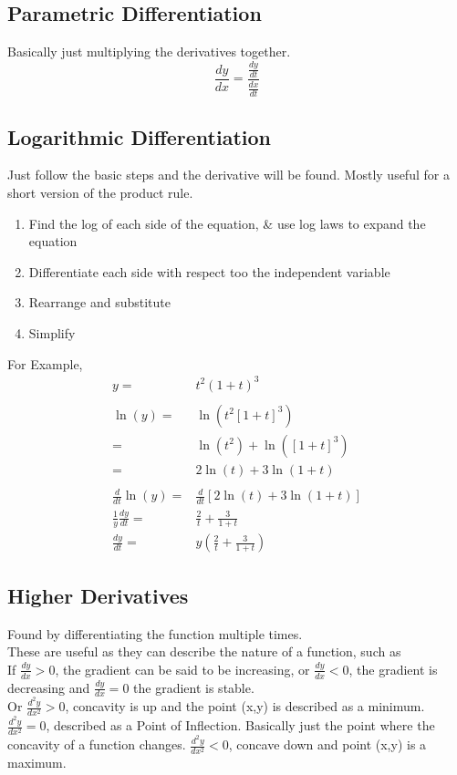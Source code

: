 \documentclass[a5paper]{article}
\begin{document}
	\subsection{Parametric Differentiation}
	Basically just multiplying the derivatives together.
	$$\frac{dy}{dx}=\frac{\frac{dy}{dt}}{\frac{dx}{dt}}$$

	\pagebreak

	\subsection{Logarithmic Differentiation}
	Just follow the basic steps and the derivative will be found. Mostly useful for a short version of the product rule.
	\begin{enumerate}
		\item Find the log of each side of the equation, \& use log laws to expand the equation
		\item Differentiate each side with respect too the independent variable
		\item Rearrange and substitute
		\item Simplify
	\end{enumerate}
	For Example,
	\begin{align*}
		y=&t^{2}(1+t)^{3}\\\\
		\ln{(y)}=&\ln{(t^{2}[1+t]^{3})}\\
			=&\ln{(t^{2})}+\ln{([1+t]^{3})}\\
			=&2\ln{(t)}+3\ln{(1+t)}\\\\
		\frac{d}{dt}\ln{(y)}=&\frac{d}{dt}[2\ln{(t)}+3\ln{(1+t)}]\\
		\frac{1}{y}\frac{dy}{dt}=&\frac{2}{t}+\frac{3}{1+t}\\
		\frac{dy}{dt}=&y(\frac{2}{t}+\frac{3}{1+t})
	\end{align*}
	
	\subsection{Higher Derivatives}
	Found by differentiating the function multiple times.\\
	These are useful as they can describe the nature of a function, such as\\
	If $\frac{dy}{dx}>0$, the gradient can be said to be increasing, or $\frac{dy}{dx}<0$, the gradient is decreasing and $\frac{dy}{dx}=0$ the gradient is stable.\\
	Or $\frac{d^{2}y}{dx^{2}}>0$, concavity is up and the point (x,y) is described as a minimum. $\frac{d^{2}y}{dx^{2}}=0$, described as a Point of Inflection. Basically just the point where the concavity of a function changes. $\frac{d^{2}y}{dx^{2}}<0$, concave down and point (x,y) is a maximum.
\end{document}
